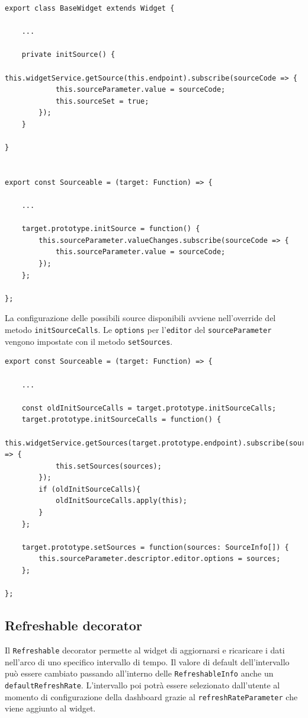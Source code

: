 \begin{lstlisting}[caption={Metodo initSource e override}, style=javaScriptCode]
export class BaseWidget extends Widget {
    
    ...
    
    private initSource() {
        this.widgetService.getSource(this.endpoint).subscribe(sourceCode => {
            this.sourceParameter.value = sourceCode;
            this.sourceSet = true;
        });
    }
    
}


export const Sourceable = (target: Function) => {

    ...

    target.prototype.initSource = function() {
        this.sourceParameter.valueChanges.subscribe(sourceCode => {
            this.sourceParameter.value = sourceCode;
        });
    };

};
\end{lstlisting}
La configurazione delle possibili source disponibili avviene nell'override del metodo \verb|initSourceCalls|. Le \verb|options| per l'\verb|editor| del \verb|sourceParameter| vengono impostate con il metodo \verb|setSources|.

\begin{lstlisting}[caption={Metodo setSources e override del metodo initSourceCalls all'interno del Sourceable Decorator}, style=javaScriptCode]
export const Sourceable = (target: Function) => {

    ...
    
    const oldInitSourceCalls = target.prototype.initSourceCalls;
    target.prototype.initSourceCalls = function() {
        this.widgetService.getSources(target.prototype.endpoint).subscribe(sources => {
            this.setSources(sources);
        });
        if (oldInitSourceCalls){
            oldInitSourceCalls.apply(this);
        }
    };

    target.prototype.setSources = function(sources: SourceInfo[]) {
        this.sourceParameter.descriptor.editor.options = sources;
    };

};
\end{lstlisting}
\subsection{Refreshable decorator}
Il \verb|Refreshable| decorator permette al widget di aggiornarsi e ricaricare i dati nell'arco di uno specifico intervallo di tempo. Il valore di default dell'intervallo può essere cambiato passando all'interno delle \verb|RefreshableInfo| anche un \verb|defaultRefreshRate|.
L'intervallo poi potrà essere selezionato dall'utente al momento di configurazione della dashboard grazie al \verb|refreshRateParameter| che viene aggiunto al widget.

